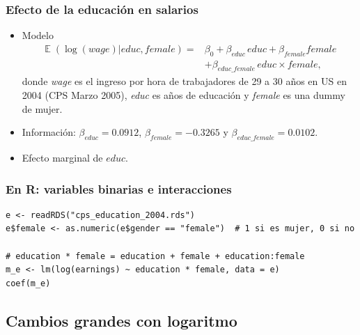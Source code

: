\documentclass[t, compress, spanish, aspectratio=169]{beamer}
\DeclareMathOperator{\E}{\mathbb{E}}
\begin{document}
    \begin{frame}
        \frametitle{Efecto de la educaci\'on en salarios}
        \begin{itemize}
            \item Modelo
            \begin{align*}
            		\E( \log(wage)|educ, female) =& \beta_0 +\beta_{educ} \,educ +\beta_{female} female\\
            		&+\beta_{educ\_female} \,educ \times female,
            \end{align*}
            donde \emph{wage} es el ingreso por hora de trabajadores de 29 a 30 a\~nos en US en 2004 (CPS Marzo 2005), \emph{educ} es a\~nos de educaci\'on y \emph{female} es una dummy de mujer.
            \item Informaci\'on: $\beta_{educ}=0.0912$, $\beta_{female}=-0.3265$ y $\beta_{educ\_female}=0.0102$.
            \item Efecto marginal de $educ$.
        \end{itemize}
    \end{frame}
\begin{frame}[fragile]
	\frametitle{En R: variables binarias e interacciones}
\footnotesize
\begin{verbatim}
e <- readRDS("cps_education_2004.rds")
e$female <- as.numeric(e$gender == "female")  # 1 si es mujer, 0 si no

# education * female = education + female + education:female
m_e <- lm(log(earnings) ~ education * female, data = e)
coef(m_e)
\end{verbatim}
\end{frame}
%    
    
    \subsection*{Cambios grandes con logaritmo}
    
\end{document}
